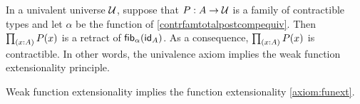 \documentclass[hott-all.tex]{subfiles}
\begin{document}
\begin{thm}\label{uatowfe}
In a univalent universe $\type$, suppose that $P:A\to\type$ is a family of contractible types
and let $\alpha$ be the function of \cref{contrfamtotalpostcompequiv}.
Then $\prd{x:A}P(x)$ is a retract of $\hfiber{\alpha}{\idfunc[A]}$. As a consequence, $\prd{x:A}P(x)$ is contractible. In other words, the univalence axiom implies the weak function extensionality principle.
\end{thm}



\begin{thm}\label{wfetofe}
Weak function extensionality implies the function extensionality \cref{axiom:funext}.
\end{thm}
\end{document}
